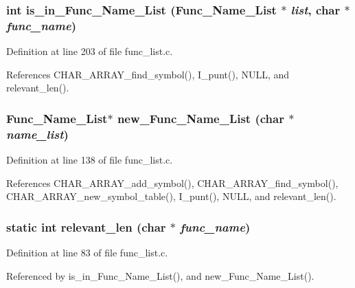 \subsubsection{\setlength{\rightskip}{0pt plus 5cm}int is\_\-in\_\-Func\_\-Name\_\-List (\bf{Func\_\-Name\_\-List} $\ast$ {\em list}, char $\ast$ {\em func\_\-name})}\label{func__list_8c_76984b7e4f8aaeb8441c6f4fb57f02fb}




Definition at line 203 of file func\_\-list.c.

References CHAR\_\-ARRAY\_\-find\_\-symbol(), I\_\-punt(), NULL, and relevant\_\-len().
\subsubsection{\setlength{\rightskip}{0pt plus 5cm}\bf{Func\_\-Name\_\-List}$\ast$ new\_\-Func\_\-Name\_\-List (char $\ast$ {\em name\_\-list})}\label{func__list_8c_34b5c5220cf09c263e3afec4a0441755}




Definition at line 138 of file func\_\-list.c.

References CHAR\_\-ARRAY\_\-add\_\-symbol(), CHAR\_\-ARRAY\_\-find\_\-symbol(), CHAR\_\-ARRAY\_\-new\_\-symbol\_\-table(), I\_\-punt(), NULL, and relevant\_\-len().
\subsubsection{\setlength{\rightskip}{0pt plus 5cm}static int relevant\_\-len (char $\ast$ {\em func\_\-name})\hspace{0.3cm}{\tt  [static]}}\label{func__list_8c_37678202c7626967d72979e37776a519}




Definition at line 83 of file func\_\-list.c.

Referenced by is\_\-in\_\-Func\_\-Name\_\-List(), and new\_\-Func\_\-Name\_\-List().